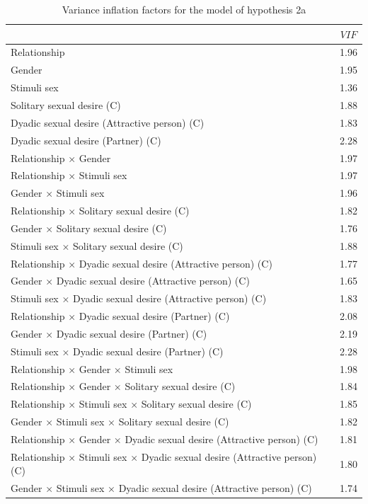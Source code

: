 \documentclass[
  bookmarksnumbered]{article}
\begin{document}
\begin{table}[H]

\caption{\label{tab:coli-m2b}Variance inflation factors for the model of hypothesis 2a}
\centering
\begin{tabular}[t]{lc}
\toprule
  & $VIF$\\
\midrule
Relationship & 1.96\\
Gender & 1.95\\
Stimuli sex & 1.36\\
Solitary sexual desire (C) & 1.88\\
Dyadic sexual desire (Attractive person) (C) & 1.83\\
Dyadic sexual desire (Partner) (C) & 2.28\\
Relationship × Gender & 1.97\\
Relationship × Stimuli sex & 1.97\\
Gender × Stimuli sex & 1.96\\
Relationship × Solitary sexual desire (C) & 1.82\\
Gender × Solitary sexual desire (C) & 1.76\\
Stimuli sex × Solitary sexual desire (C) & 1.88\\
Relationship × Dyadic sexual desire (Attractive person) (C) & 1.77\\
Gender × Dyadic sexual desire (Attractive person) (C) & 1.65\\
Stimuli sex × Dyadic sexual desire (Attractive person) (C) & 1.83\\
Relationship × Dyadic sexual desire (Partner) (C) & 2.08\\
Gender × Dyadic sexual desire (Partner) (C) & 2.19\\
Stimuli sex × Dyadic sexual desire (Partner) (C) & 2.28\\
Relationship × Gender × Stimuli sex & 1.98\\
Relationship × Gender × Solitary sexual desire (C) & 1.84\\
Relationship × Stimuli sex × Solitary sexual desire (C) & 1.85\\
Gender × Stimuli sex × Solitary sexual desire (C) & 1.82\\
Relationship × Gender × Dyadic sexual desire (Attractive person) (C) & 1.81\\
Relationship × Stimuli sex × Dyadic sexual desire (Attractive person) (C) & 1.80\\
Gender × Stimuli sex × Dyadic sexual desire (Attractive person) (C) & 1.74\\

\end{tabular}
\end{table}
\end{document}

